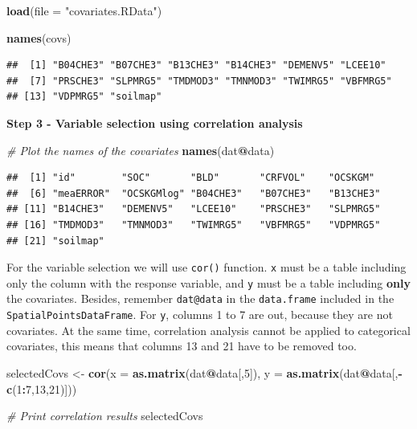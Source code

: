 \documentclass[10pt,b5paper,]{book}
\newenvironment{Shaded}{\begin{snugshade}}{\end{snugshade}}
\newcommand{\CommentTok}[1]{\textcolor[rgb]{0.56,0.35,0.01}{\textit{#1}}}
\newcommand{\DataTypeTok}[1]{\textcolor[rgb]{0.13,0.29,0.53}{#1}}
\newcommand{\DecValTok}[1]{\textcolor[rgb]{0.00,0.00,0.81}{#1}}
\newcommand{\KeywordTok}[1]{\textcolor[rgb]{0.13,0.29,0.53}{\textbf{#1}}}
\newcommand{\NormalTok}[1]{#1}
\newcommand{\OperatorTok}[1]{\textcolor[rgb]{0.81,0.36,0.00}{\textbf{#1}}}
\newcommand{\StringTok}[1]{\textcolor[rgb]{0.31,0.60,0.02}{#1}}
\theoremstyle{definition}
\theoremstyle{definition}
\theoremstyle{definition}
\theoremstyle{remark}
\begin{document}
\begin{Shaded}
\begin{Highlighting}[]
\KeywordTok{load}\NormalTok{(}\DataTypeTok{file =} \StringTok{"covariates.RData"}\NormalTok{)}

\KeywordTok{names}\NormalTok{(covs)}
\end{Highlighting}
\end{Shaded}

\begin{verbatim}
##  [1] "B04CHE3" "B07CHE3" "B13CHE3" "B14CHE3" "DEMENV5" "LCEE10" 
##  [7] "PRSCHE3" "SLPMRG5" "TMDMOD3" "TMNMOD3" "TWIMRG5" "VBFMRG5"
## [13] "VDPMRG5" "soilmap"
\end{verbatim}

\textbf{Step 3 - Variable selection using correlation analysis}

\begin{Shaded}
\begin{Highlighting}[]
\CommentTok{# Plot the names of the covariates}
\KeywordTok{names}\NormalTok{(dat}\OperatorTok{@}\NormalTok{data)}
\end{Highlighting}
\end{Shaded}

\begin{verbatim}
##  [1] "id"        "SOC"       "BLD"       "CRFVOL"    "OCSKGM"   
##  [6] "meaERROR"  "OCSKGMlog" "B04CHE3"   "B07CHE3"   "B13CHE3"  
## [11] "B14CHE3"   "DEMENV5"   "LCEE10"    "PRSCHE3"   "SLPMRG5"  
## [16] "TMDMOD3"   "TMNMOD3"   "TWIMRG5"   "VBFMRG5"   "VDPMRG5"  
## [21] "soilmap"
\end{verbatim}

For the variable selection we will use \texttt{cor()} function.
\texttt{x} must be a table including only the column with the response
variable, and \texttt{y} must be a table including \textbf{only} the
covariates. Besides, remember \texttt{dat@data} in the
\texttt{data.frame} included in the \texttt{SpatialPointsDataFrame}. For
\texttt{y}, columns 1 to 7 are out, because they are not covariates. At
the same time, correlation analysis cannot be applied to categorical
covariates, this means that columns 13 and 21 have to be removed too.

\begin{Shaded}
\begin{Highlighting}[]
\NormalTok{selectedCovs <-}\StringTok{ }\KeywordTok{cor}\NormalTok{(}\DataTypeTok{x =} \KeywordTok{as.matrix}\NormalTok{(dat}\OperatorTok{@}\NormalTok{data[,}\DecValTok{5}\NormalTok{]),}
           \DataTypeTok{y =} \KeywordTok{as.matrix}\NormalTok{(dat}\OperatorTok{@}\NormalTok{data[,}\OperatorTok{-}\KeywordTok{c}\NormalTok{(}\DecValTok{1}\OperatorTok{:}\DecValTok{7}\NormalTok{,}\DecValTok{13}\NormalTok{,}\DecValTok{21}\NormalTok{)]))}

\CommentTok{# Print correlation results}
\NormalTok{selectedCovs}
\end{Highlighting}
\end{Shaded}
\end{document}
